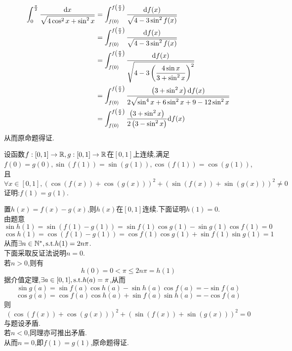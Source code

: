 \documentclass{ctexart}
\begin{document}
\begin{solution}[Solution.]
\begin{enumerate}[label=\textbf{(\arabic*)}]
\begin{align*}
                \int_{0}^{\frac{\pi}{2}}{\dfrac{\mathrm{d} x}{\sqrt{4\cos^2{x}+\sin^2{x}}}}
                &= \int_{f(0)}^{f\left(\frac{\pi}{2}\right)}{\dfrac{\mathrm{d} f(x)}{\sqrt{4-3\sin^2{f(x)}}}} \\
                &= \int_{f(0)}^{f\left(\frac{\pi}{2}\right)}{\dfrac{\mathrm{d} f(x)}{\sqrt{4-3\sin^2{f(x)}}}} \\
                &= \int_{f(0)}^{f\left(\frac{\pi}{2}\right)}{\dfrac{\mathrm{d} f(x)}{\sqrt{4-3\left(\dfrac{4\sin x}{3+\sin^2 x}\right)^2}}} \\
                &= \int_{f(0)}^{f\left(\frac{\pi}{2}\right)}{\dfrac{\left(3+\sin^2 x\right)\mathrm{d} f(x)}{2\sqrt{\sin^4 x+6\sin^2 x+9-12\sin^2 x}}} \\
                &= \int_{f(0)}^{f\left(\frac{\pi}{2}\right)}\dfrac{\left(3+\sin^2 x\right)}{2\left(3-\sin^2 x\right)}\mathrm{d} f(x)
            \end{align*}
            从而原命题得证.
    \end{enumerate}
\end{solution}
\begin{problem}[9.(10\songti{分})]
    设函数$f:[0,1]\to\mathbb{R},g:[0,1]\to\mathbb{R}$在$[0,1]$上连续,满足$f(0)=g(0),\sin(f(1))=\sin(g(1)),\cos(f(1))=\cos(g(1))$,且
    $$\forall x\in[0,1],\left(\cos(f(x))+\cos(g(x))\right)^2+\left(\sin(f(x))+\sin(g(x))\right)^2\neq 0$$
    证明:$f(1)=g(1)$.
\end{problem}
\begin{solution}[Proof.]
    置$h(x)=f(x)-g(x)$,则$h(x)$在$[0,1]$连续.下面证明$h(1)=0$.\\
    由题意$$\sin h(1)=\sin \left(f(1)-g(1)\right)=\sin f(1)\cos g(1)-\sin g(1)\cos f(1)=0$$
    $$\cos h(1)=\cos \left(f(1)-g(1)\right)=\cos f(1)\cos g(1)+\sin f(1)\sin g(1)=1$$
    从而$\exists n\in\mathbb{N}^*,\text{s.t.} h(1)=2n\pi$.\\
    下面采取反证法说明$n=0$.\\
    若$n>0$,则有$$h(0)=0<\pi\leqslant 2n\pi=h(1)$$
    据介值定理,$\exists a\in[0,1],\text{s.t.} h(a)=\pi$,从而
    $$\sin g(a)=\sin f(a)\cos h(a)-\sin h(a)\cos f(a)=-\sin f(a)$$
    $$\cos g(a)=\cos f(a)\cos h(a)+\sin f(a)\sin h(a)=-\cos f(a)$$
    则$$\left(\cos(f(x))+\cos(g(x))\right)^2+\left(\sin(f(x))+\sin(g(x))\right)^2=0$$与题设矛盾.\\
    若$n<0$,同理亦可推出矛盾.\\
    从而$n=0$,即$f(1)=g(1)$,原命题得证.
\end{solution}
\end{document}
